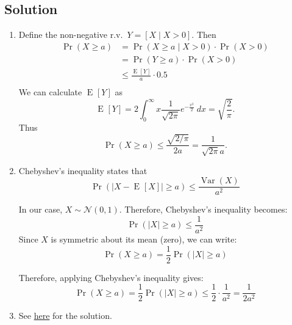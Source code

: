 \documentclass[14pt]{extreport}
\newcommand{\Var}[1]{\operatorname{Var}\left(#1\right)}
\newcommand{\E}[2][]{\operatorname{E}_{#1}\left[#2\right]}
\renewcommand{\Pr}[2][]{\operatorname{Pr}_{#1}\left(#2\right)}
\begin{document}
\subsection*{Solution}
    \begin{enumerate}
        \item Define the non-negative r.v.\ \( Y = [X \mid X > 0] \). Then 
        $$\begin{aligned}
            \Pr{X \geq a} &= \Pr{X \geq a \mid X > 0} \cdot \Pr{X > 0} \\
            &= \Pr{Y \geq a} \cdot \Pr{X > 0} \\
            &\le \frac{\E{Y}}{a} \cdot 0.5 \\
        \end{aligned}$$
        We can calculate $\E{Y}$ as
        $$\E{Y} = 2\int_{0}^{\infty} x\frac{1}{\sqrt{2\pi}} e^{-\frac{x^{2}}{2}} \ dx = \sqrt{\frac{2}{\pi}}.$$ Thus $$\Pr{X \geq a} \le \frac{\sqrt{2/\pi}}{2a} = \frac{1}{\sqrt{2\pi}a}.$$
        \item Chebyshev's inequality states that \[ \Pr{|X - \E{X}| \geq a} \le \frac{\Var{X}}{a^{2}} \]

        \vspace{2mm}
        In our case, \( X \sim \mathcal{N}(0,1) \). Therefore, Chebyshev's inequality becomes: \[ \Pr{|X| \geq a} \leq \frac{1}{a^2} \] Since \( X \) is symmetric about its mean (zero), we can write: \[ \Pr{X \geq a} = \frac{1}{2}\Pr{|X| \geq a} \]

        \vspace{2mm}
        Therefore, applying Chebyshev's inequality gives:
        \[ \Pr{X \geq a} = \frac{1}{2}\Pr{|X| \geq a} \leq \frac{1}{2} \cdot \frac{1}{a^2} = \frac{1}{2a^2} \]
        \item See \href{http://prob140.org/fa18/textbook/chapters/Chapter_19/04_Chernoff_Bound}{here} for the solution.
    \end{enumerate}
\end{document}
